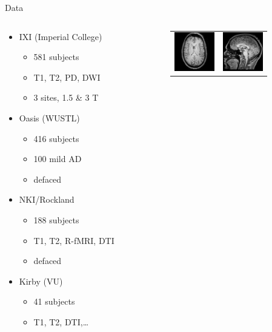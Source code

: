 \documentclass[xcolor=dvipsnames,serif,10pt]{beamer}
\begin{document}

\begin{frame}{Data}
\begin{columns}[c]
  \begin{column}[c]{0.4\textwidth}
      \begin{itemize}
		    \item IXI (Imperial College)
		      \begin{itemize}
		        \item 581 subjects
		        \item T1, T2, PD, DWI
		        \item 3 sites, 1.5 \& 3 T
		      \end{itemize}
		    \item Oasis (WUSTL)
		      \begin{itemize}
		        \item 416 subjects
		        \item 100 mild AD
		        \item defaced
		      \end{itemize}
		    \item NKI/Rockland
		      \begin{itemize}
		        \item 188 subjects
		        \item T1, T2, R-fMRI, DTI
		        \item defaced
		      \end{itemize}
		    \item Kirby (VU)
		      \begin{itemize}
		        \item 41 subjects
		        \item T1, T2, DTI,\ldots
		      \end{itemize}
		  \end{itemize}    
  \end{column}  
 \begin{column}[c]{0.4\textwidth}
   \begin{tabular}{cc}
     \vspace{-0.05cm}
     \includegraphics[width=1.75cm]{IXI048_axial.png} &  
     \includegraphics[width=1.75cm]{IXI048_sag.png} \\

\end{tabular}
\end{column}
\end{columns}
\end{frame}
\end{document}
